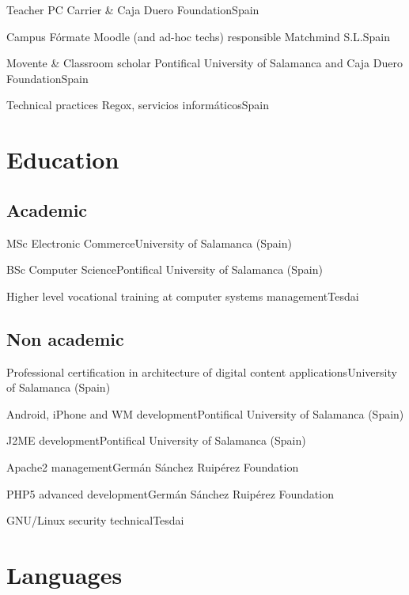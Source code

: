 \documentclass[11pt, a4paper, sans]{moderncv}
\begin{document}
{Teacher}
{PC Carrier \& Caja Duero Foundation}{Spain}{}{}

{Campus Fórmate Moodle (and ad-hoc techs) responsible}
{Matchmind S.L.}{Spain}{}{}

{Movente \& Classroom scholar}
{Pontifical University of Salamanca and Caja Duero Foundation}{Spain}{}{}

{Technical practices}
{Regox, servicios informáticos}{Spain}{}{}


%
%

\section{Education}
\subsection{Academic}
{MSc Electronic Commerce}{University of Salamanca (Spain)}{}{}{}

{BSc Computer Science}{Pontifical University of Salamanca (Spain)}{}{}{}

{Higher level vocational training at computer systems management}{Tesdai}{}{}{}

\subsection{Non academic}
{Professional certification in architecture of digital content applications}{University of Salamanca (Spain)}{}{}{}

{Android, iPhone and WM development}{Pontifical University of Salamanca (Spain)}{}{}{}

{J2ME development}{Pontifical University of Salamanca (Spain)}{}{}{}

{Apache2 management}{Germán Sánchez Ruipérez Foundation}{}{}{}

{PHP5 advanced development}{Germán Sánchez Ruipérez Foundation}{}{}{}

{GNU/Linux security technical}{Tesdai}{}{}{}

%
%

\section{Languages}
\end{document}
